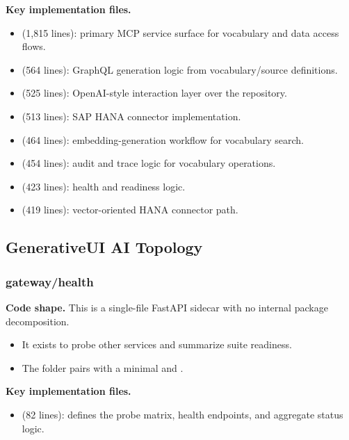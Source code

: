 \documentclass[11pt,a4paper]{article}
\begin{document}
\textbf{Key implementation files.}
\begin{itemize}[leftmargin=*]
    \item {} (1,815 lines): primary MCP service surface for vocabulary and data access flows.
    \item {} (564 lines): GraphQL generation logic from vocabulary/source definitions.
    \item {} (525 lines): OpenAI-style interaction layer over the repository.
    \item {} (513 lines): SAP HANA connector implementation.
    \item {} (464 lines): embedding-generation workflow for vocabulary search.
    \item {} (454 lines): audit and trace logic for vocabulary operations.
    \item {} (423 lines): health and readiness logic.
    \item {} (419 lines): vector-oriented HANA connector path.
\end{itemize}

\subsection{GenerativeUI AI Topology}

\subsubsection{gateway/health}

\textbf{Code shape.} This is a single-file FastAPI sidecar with no internal package decomposition.
\begin{itemize}[leftmargin=*]
    \item It exists to probe other services and summarize suite readiness.
    \item The folder pairs  with a minimal  and .
\end{itemize}

\textbf{Key implementation files.}
\begin{itemize}[leftmargin=*]
    \item {} (82 lines): defines the probe matrix, health endpoints, and aggregate status logic.
\end{itemize}
\end{document}
